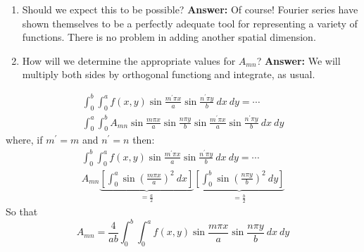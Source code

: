\begin{enumerate}

\item Should we expect this to be possible?  \textbf{Answer:} Of course!  Fourier series have shown themselves to be a perfectly adequate tool for representing a variety of functions.  There is no problem in adding another spatial dimension.

\item How will we determine the appropriate values for $A_{mn}$?  \textbf{Answer:} We will multiply both sides by orthogonal function\underline{s} and integrate, as usual.

\end{enumerate}
\begin{multline*}
\int_0^b \int_0^a f(x,y) \sin{\frac{m^{\prime} \pi x}{a}} \sin{\frac{n^{\prime} \pi y}{b}} \ dx \ dy = \cdots \\ \int_0^a \int_0^b A_{mn}\sin{\frac{m \pi x}{a}} \sin{\frac{n \pi y}{b}}\sin{\frac{m^{\prime} \pi x}{a}} \sin{\frac{n^{\prime} \pi y}{b}} \ dx \ dy
\end{multline*}
where, if $m^{\prime}=m$ and $n^{\prime} = n$ then:
\begin{multline*}
\int_0^b \int_0^a f(x,y) \sin{\frac{m^{\prime} \pi x}{a}} \sin{\frac{n^{\prime} \pi y}{b}} \ dx \ dy = \cdots \\ A_{mn} \underbrace{\left[\int_0^a \sin{(\frac{m \pi x}{a})}^2 \ dx \right]}_{=\frac{a}{2}} \underbrace{ \left[ \int_0^b \sin{(\frac{n \pi y}{b})}^2 \ dy \right]}_{=\frac{b}{2}}
\end{multline*}
So that
\begin{equation}
A_{mn} = \frac{4}{a b} \int_0^b \int_0^a f(x,y) \sin{\frac{m \pi x}{a}} \sin{\frac{n \pi y}{b}} \ dx \ dy
\label{eq:double-fourier-coeff}
\end{equation}

